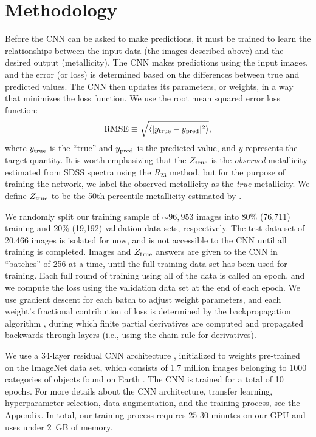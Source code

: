 \documentclass[fleqn,usenatbib]{mnras}
\begin{document}
\section{Methodology}\label{sec:training}
Before the CNN can be asked to make predictions, it must be trained to learn the relationships between the input data (the images described above) and the desired output (metallicity). The CNN makes predictions using the input images, and the error (or loss) is determined based on the differences between true and predicted values. The CNN then updates its parameters, or weights, in a way that minimizes the loss function. We use the root mean squared error loss function:
\begin{equation}
\mathrm{RMSE} \equiv \sqrt{\langle |y_{\rm true} - y_{\rm pred}|^2\rangle},
\end{equation}
where $y_{\rm true}$ is the ``true'' and $y_{\rm pred}$ is the predicted value, and $y$ represents the target quantity. It is worth emphasizing that the $Z_{\rm true}$ is the \textit{observed} metallicity estimated from SDSS spectra using the $R_{23}$ method, but for the purpose of training the network, we label the observed metallicity as the \textit{true} metallicity. We define $Z_{\rm true}$ to be the 50th percentile metallicity estimated by \cite{Tremonti2004}.

We randomly split our training sample of $\sim 96,953$ images into 80\% (76,711) training and 20\% (19,192) validation data sets, respectively. The test data set of 20,466 images is isolated for now, and is not accessible to the CNN until all training is completed. Images and $Z_{\rm true}$ answers are given to the CNN in ``batches'' of 256 at a time, until the full training data set has been used for training. Each full round of training using all of the data is called an epoch, and we compute the loss using the validation data set at the end of each epoch.
We use gradient descent for each batch to adjust weight parameters, and each weight's fractional contribution of loss is determined by the backpropagation algorithm \citep{LeCun1989}, during which finite partial derivatives are computed and propagated backwards through layers (i.e., using the chain rule for derivatives).

We use a 34-layer residual CNN architecture \citep{He2015}, initialized to weights pre-trained on the ImageNet data set, which consists of 1.7 million images belonging to 1000 categories of objects found on Earth \citep[e.g., cats, horses, cars, or books;][]{ImageNet}.
The CNN is trained for a total of 10 epochs.
For more details about the CNN architecture, transfer learning, hyperparameter selection, data augmentation, and the training process, see the Appendix.
In total, our training process requires 25-30 minutes on our GPU and uses under 2~GB of memory.
\end{document}

